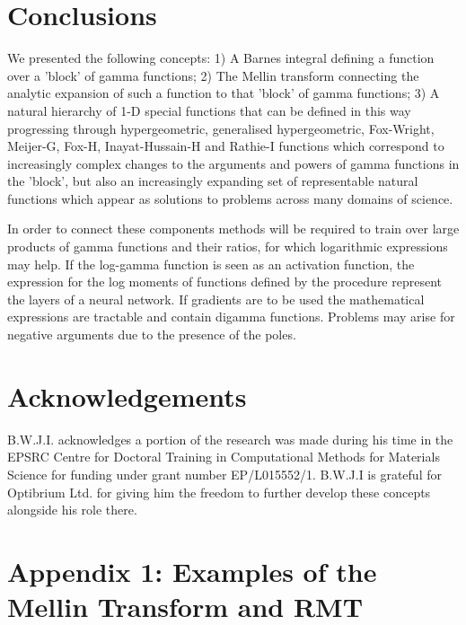 \documentclass[journal=jcisd8,manuscript=article,layout=onecolumn,pdftex,floatfix,amsmath,amssymb,10pt]{achemso}
\begin{document}
\section{Conclusions}
We presented the following concepts: 1) A Barnes integral defining a function over a 'block' of gamma functions; 2) The Mellin transform connecting the analytic expansion of such a function to that 'block' of gamma functions; 3) A natural hierarchy of 1-D special functions that can be defined in this way progressing through hypergeometric, generalised hypergeometric, Fox-Wright, Meijer-G, Fox-H, Inayat-Hussain-H and Rathie-I functions which correspond to increasingly complex changes to the arguments and powers of gamma functions in the 'block', but also an increasingly expanding set of representable natural functions which appear as solutions to problems across many domains of science.


In order to connect these components methods will be required to train over large products of gamma functions and their ratios, for which logarithmic expressions may help. If the log-gamma function is seen as an activation function, the expression for the log moments of functions defined by the procedure represent the layers of a neural network. If gradients are to be used the mathematical expressions are tractable and contain digamma functions. Problems may arise for negative arguments due to the presence of the poles.



\section{Acknowledgements}
B.W.J.I. acknowledges a portion of the research was made during his time in the EPSRC Centre for Doctoral Training in Computational Methods for Materials Science for funding under grant number EP/L015552/1. B.W.J.I is grateful for Optibrium Ltd. for giving him the freedom to further develop these concepts alongside his role there.







\section{Appendix 1: Examples of the Mellin Transform and RMT}
\end{document}
